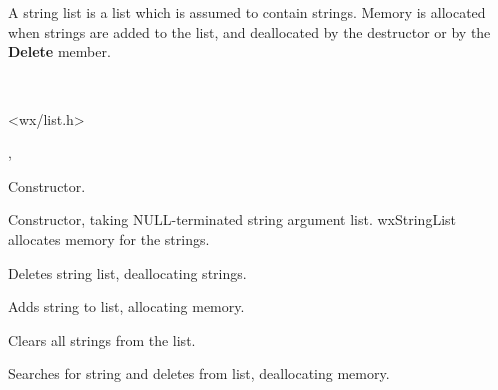 \section{}\label{wxstringlist}

A string list is a list which is assumed to contain strings.
Memory is allocated when strings are added to
the list, and deallocated by the destructor or by the {\bf Delete}\rtfsp
member.


\\


<wx/list.h>


, 




Constructor.


Constructor, taking NULL-terminated string argument list. wxStringList
allocates memory for the strings.



Deletes string list, deallocating strings.



Adds string to list, allocating memory.



Clears all strings from the list.



Searches for string and deletes from list, deallocating memory.



